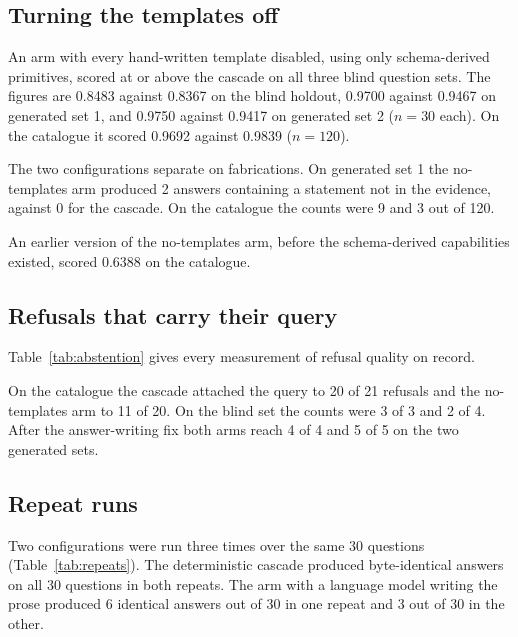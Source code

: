 \subsection{Turning the templates off}

An arm with every hand-written template disabled, using only schema-derived
primitives, scored at or above the cascade on all three blind question sets. The
figures are 0.8483 against 0.8367 on the blind holdout, 0.9700 against 0.9467 on
generated set 1, and 0.9750 against 0.9417 on generated set 2 ($n = 30$ each).
On the catalogue it scored 0.9692 against 0.9839 ($n = 120$).

The two configurations separate on fabrications. On generated set 1 the
no-templates arm produced 2 answers containing a statement not in the evidence,
against 0 for the cascade. On the catalogue the counts were 9 and 3 out of 120.

An earlier version of the no-templates arm, before the schema-derived
capabilities existed, scored 0.6388 on the catalogue.

\subsection{Refusals that carry their query}

Table~\ref{tab:abstention} gives every measurement of refusal quality on record.

\begin{table}[htbp]
\caption{How often a refusal to answer arrives with the executed query attached.
Counts are of answers that declined to assert. The first four rows predate the
answer-writing fix; the last eight follow it. Produced by
.}
\label{tab:abstention}
\centering\small

\end{table}

On the catalogue the cascade attached the query to 20 of 21 refusals and the
no-templates arm to 11 of 20. On the blind set the counts were 3 of 3 and 2 of
4. After the answer-writing fix both arms reach 4 of 4 and 5 of 5 on the two
generated sets.

\subsection{Repeat runs}

Two configurations were run three times over the same 30 questions
(Table~\ref{tab:repeats}). The deterministic cascade produced byte-identical
answers on all 30 questions in both repeats. The arm with a language model
writing the prose produced 6 identical answers out of 30 in one repeat and 3 out
of 30 in the other.

